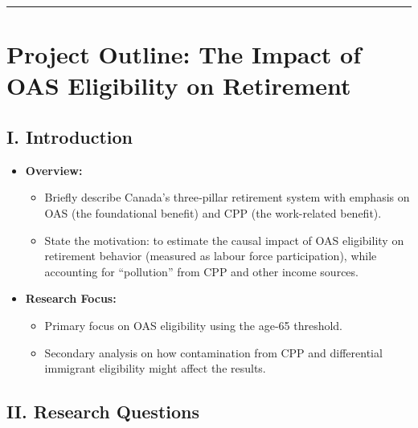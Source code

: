 \documentclass[
]{article}
\providecommand{\tightlist}{%
  \setlength{\itemsep}{0pt}\setlength{\parskip}{0pt}}
\begin{document}
\begin{center}\rule{0.5\linewidth}{0.5pt}\end{center}

\section{Project Outline: The Impact of OAS Eligibility on
Retirement}\label{project-outline-the-impact-of-oas-eligibility-on-retirement}

\subsection{I. Introduction}\label{i.-introduction}

\begin{itemize}
\tightlist
\item
  \textbf{Overview:}

  \begin{itemize}
  \tightlist
  \item
    Briefly describe Canada's three‐pillar retirement system with
    emphasis on OAS (the foundational benefit) and CPP (the work-related
    benefit).
  \item
    State the motivation: to estimate the causal impact of OAS
    eligibility on retirement behavior (measured as labour force
    participation), while accounting for ``pollution'' from CPP and
    other income sources.
  \end{itemize}
\item
  \textbf{Research Focus:}

  \begin{itemize}
  \tightlist
  \item
    Primary focus on OAS eligibility using the age-65 threshold.
  \item
    Secondary analysis on how contamination from CPP and differential
    immigrant eligibility might affect the results.
  \end{itemize}
\end{itemize}

\subsection{II. Research Questions}\label{ii.-research-questions}
\end{document}
